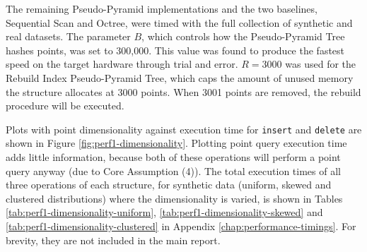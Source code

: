 The remaining Pseudo-Pyramid implementations and the two baselines, Sequential Scan and Octree, were timed with the full collection of synthetic and real datasets. The parameter $B$, which controls how the Pseudo-Pyramid Tree hashes points, was set to 300,000. This value was found to produce the fastest speed on the target hardware through trial and error. $R=3000$ was used for the Rebuild Index Pseudo-Pyramid Tree, which caps the amount of unused memory the structure allocates at 3000 points. When 3001 points are removed, the rebuild procedure will be executed.

Plots with point dimensionality against execution time for \texttt{insert} and \texttt{delete} are shown in Figure \ref{fig:perf1-dimensionality}. Plotting point query execution time adds little information, because both of these operations will perform a point query anyway (due to Core Assumption (4)). The total execution times of all three operations of each structure, for synthetic data (uniform, skewed and clustered distributions) where the dimensionality is varied, is shown in Tables \ref{tab:perf1-dimensionality-uniform}, \ref{tab:perf1-dimensionality-skewed} and \ref{tab:perf1-dimensionality-clustered} in Appendix \ref{chap:performance-timings}. For brevity, they are not included in the main report.

